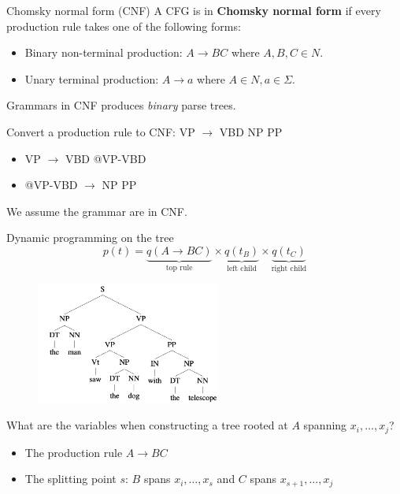 \documentclass[usenames,dvipsnames,notes]{beamer}
\begin{document}
\begin{frame}
    {Chomsky normal form (CNF)}
    A CFG is in \textbf{Chomsky normal form} if every production rule takes one of the following forms:
    \begin{itemize}
        \item Binary non-terminal production: $A\rightarrow BC$ where $A, B, C\in N$.
        \item Unary terminal production: $A\rightarrow a$ where $A\in N, a\in\Sigma$.
    \end{itemize}

    Grammars in CNF produces \emph{binary} parse trees.

    Convert a production rule to CNF: VP $\rightarrow$ VBD NP PP\\
    \begin{itemize}
        \item[] VP $\rightarrow$ VBD @VP-VBD
        \item[] @VP-VBD $\rightarrow$ NP PP
    \end{itemize}

    We assume the grammar are in CNF.
\end{frame}

\begin{frame}
    {Dynamic programming on the tree}
    $$
    p(t) = \underbrace{q(A\rightarrow B C)}_{\text{top rule}}
    \times \underbrace{q(t_B)}_{\text{left child}}
    \times \underbrace{q(t_C)}_{\text{right child}}
    $$
    \vspace{-1em}
    \begin{figure}
        \includegraphics[height=4cm]{figures/parse-2.png}
    \end{figure}
    \vspace{-1em}
    What are the variables when constructing a tree rooted at $A$ spanning $x_i,\ldots,x_j$?\\
    \begin{itemize}
        \item The production rule $A\rightarrow B C$
        \item The splitting point $s$: $B$ spans $x_i,\ldots,x_s$ and
            $C$ spans $x_{s+1}, \ldots, x_j$
    \end{itemize}
\end{frame}
\end{document}
